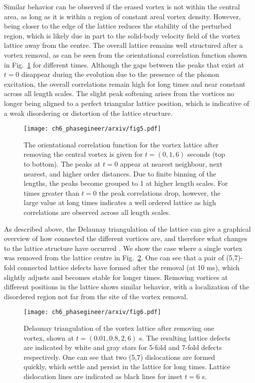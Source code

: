 Similar behavior can be observed if the erased vortex is not within the central area, as long as it is within a region of constant areal vortex density. However, being closer to the edge of the lattice reduces the stability of the perturbed region, which is likely due in part to the solid-body velocity field of the vortex lattice away from the centre. The overall lattice remains well structured after a vortex removal, as can be seen from the orientational correlation function shown in Fig.~\ref{fig:g6} for different times. Although the gaps between the peaks that exist at $t=0$ disappear during the evolution due to the presence of the phonon excitation, the overall correlations remain high for long times and near constant across all length scales. The slight peak softening arises from the vortices no longer being aligned to a perfect triangular lattice position, which is indicative of a weak disordering or distortion of the lattice structure.

\begin{figure}\centering
    \texttt{[image: ch6\_phasegineer/arxiv/fig5.pdf]}
    \caption{The orientational correlation function for the vortex lattice after removing the central vortex is given for $t=(0,1,6)$ seconds (top to bottom). The peaks at $t=0$ appear at nearest neighbour, next nearest, and higher order distances. Due to finite binning of the lengths, the peaks become grouped to 1 at higher length scales. For times greater than $t=0$ the peak correlations drop, however, the large value at long times indicates a well ordered lattice as high correlations are observed across all length scales.}\label{fig:g6}
\end{figure}

As described above, the Delaunay triangulation of the lattice can give a graphical overview of how connected the different vortices are, and therefore what changes to the lattice structure have occurred \cite{Guillamon_nat_2014}. We show the case where a single vortex was removed from the lattice centre in Fig.~\ref{fig:deltri_1vtx}. One can see that a pair of (5,7)-fold connected lattice defects have formed after the removal (at 10 ms), which slightly adjusts and becomes stable for longer times. Removing vortices at different positions in the lattice shows similar behavior, with a localization of the disordered region not far from the site of the vortex removal.

\begin{figure}\centering
    \texttt{[image: ch6\_phasegineer/arxiv/fig6.pdf]}
    \caption{Delaunay triangulation of the vortex lattice after removing one vortex, shown at $t=(0.01,0.8,2,6)$ s. The resulting lattice defects are indicated by white and gray stars for 5-fold and 7-fold defects respectively. One can see that two (5,7) dislocations are formed quickly, which settle and persist in the lattice for long times. Lattice dislocation lines are indicated as black lines for inset $t=6$ s.}\label{fig:deltri_1vtx}
\end{figure}

